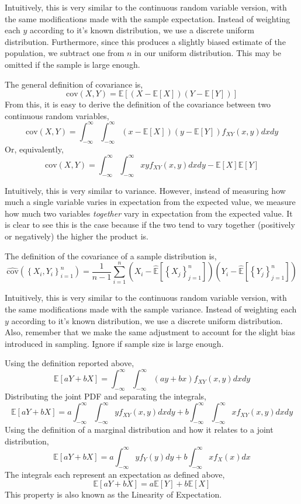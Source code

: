 \documentclass[12pt,twoside]{article}
\begin{document}
\begin{problems}
\begin{problemparts}
Intuitively, this is very similar to the continuous random variable version,
with the same modifications made with the sample expectation. Instead of weighting
each $y$ according to it's known distribution, we use a discrete uniform 
distribution. Furthermore, since this produces a slightly biased estimate of the
population, we subtract one from $n$ in our uniform distribution. This may be
omitted if the sample is large enough.

\problempart %

The general definition of covariance is,
$$ \mathrm{cov}(X, Y) = \mathbb{E}\left[\left(X - \mathbb{E}[X]\right)\left(Y - 
\mathbb{E}[Y]\right)\right] $$
From this, it is easy to derive the definition of the covariance between two
continuous random variables,
$$ \mathrm{cov}(X, Y) = \int_{-\infty}^{\infty} \int_{-\infty}^{\infty} \left(x
- \mathbb{E}[X]\right) \left(y - \mathbb{E}[Y]\right) f_{XY}(x, y) dx dy $$
Or, equivalently,
$$ \mathrm{cov}(X, Y) = \int_{-\infty}^{\infty} \int_{-\infty}^{\infty} x y 
f_{XY}(x, y) dx dy - \mathbb{E}[X] \mathbb{E}[Y] $$

Intuitively, this is very similar to variance. However, instead of measuring how
much a single variable varies in expectation from the expected value, we measure
how much two variables \textit{together} vary in expectation from the expected
value. It is clear to see this is the case because if the two tend to vary
together (positively or negatively) the higher the product is.

\problempart %

The definition of the covariance of a sample distribution is,
$$ \hat{\mathrm{cov}}(\left\{X_i, Y_i\right\}_{i = 1}^n) = \frac{1}{n - 1} 
\sum_{i = 1}^{n} \left(X_i - \hat{\mathbb{E}}\left[\left\{X_j\right\}_{j =
1}^n\right]\right) \left(Y_i - \hat{\mathbb{E}}\left[\left\{Y_j\right\}_{j = 
1}^n\right]\right) $$

Intuitively, this is very similar to the continuous random variable version,
with the same modifications made with the sample variance. Instead of weighting
each $y$ according to it's known distribution, we use a discrete uniform
distribution. Also, remember that we make the same adjustment to account for the
slight bias introduced in sampling. Ignore if sample size is large enough.

\problempart %

Using the definition reported above,
$$ \mathbb{E}[aY + bX] = \int_{-\infty}^{\infty} \int_{-\infty}^{\infty} \left(
ay + bx\right) f_{XY}(x, y) dx dy $$
Distributing the joint PDF and separating the integrals,
$$ \mathbb{E}[aY + bX] = a \int_{-\infty}^{\infty} \int_{-\infty}^{\infty} y
f_{XY}(x, y) dx dy + b \int_{-\infty}^{\infty} \int_{-\infty}^{\infty} x
f_{XY}(x, y) dx dy$$
Using the definition of a marginal distribution and how it relates to a joint
distribution,
$$ \mathbb{E}[aY + bX] = a \int_{-\infty}^{\infty} y f_{Y}(y) dy + b 
\int_{-\infty}^{\infty} x f_{X}(x) dx $$
The integrals each represent an expectation as defined above,
$$ \mathbb{E}[aY + bX] = a \mathbb{E}[Y] + b \mathbb{E}[X] $$
This property is also known as the Linearity of Expectation.


\end{problemparts}
\end{problems}
\end{document}
